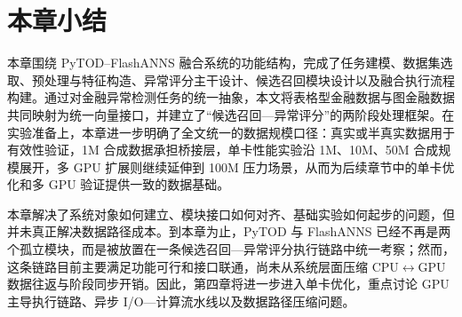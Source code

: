 \FloatBarrier

\section{本章小结}

本章围绕 PyTOD--FlashANNS 融合系统的功能结构，完成了任务建模、数据集选取、预处理与特征构造、异常评分主干设计、候选召回模块设计以及融合执行流程构建。通过对金融异常检测任务的统一抽象，本文将表格型金融数据与图金融数据共同映射为统一向量接口，并建立了``候选召回---异常评分''的两阶段处理框架。在实验准备上，本章进一步明确了全文统一的数据规模口径：真实或半真实数据用于有效性验证，1M 合成数据承担桥接层，单卡性能实验沿 1M、10M、50M 合成规模展开，多 GPU 扩展则继续延伸到 100M 压力场景，从而为后续章节中的单卡优化和多 GPU 验证提供一致的数据基础。

本章解决了系统对象如何建立、模块接口如何对齐、基础实验如何起步的问题，但并未真正解决数据路径成本。到本章为止，PyTOD 与 FlashANNS 已经不再是两个孤立模块，而是被放置在一条候选召回---异常评分执行链路中统一考察；然而，这条链路目前主要满足功能可行和接口联通，尚未从系统层面压缩 CPU$\leftrightarrow$GPU 数据往返与阶段同步开销。因此，第四章将进一步进入单卡优化，重点讨论 GPU 主导执行链路、异步 I/O---计算流水线以及数据路径压缩问题。
